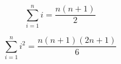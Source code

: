 \documentclass[aps,onecolumn,11pt]{revtex4}
\begin{document}
\begin{equation}
	\sum_{i=1}^n i = \dfrac{n(n+1)}{2}
\end{equation}

\begin{equation}
	\sum_{i=1}^n i^2 = \dfrac{n(n+1)(2n+1)}{6}
\end{equation}
\end{document}
